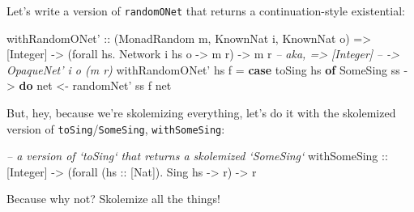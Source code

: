 \documentclass[]{article}
\newenvironment{Shaded}{}{}
\newcommand{\KeywordTok}[1]{\textcolor[rgb]{0.00,0.44,0.13}{\textbf{{#1}}}}
\newcommand{\DataTypeTok}[1]{\textcolor[rgb]{0.56,0.13,0.00}{{#1}}}
\newcommand{\CommentTok}[1]{\textcolor[rgb]{0.38,0.63,0.69}{\textit{{#1}}}}
\newcommand{\OtherTok}[1]{\textcolor[rgb]{0.00,0.44,0.13}{{#1}}}
\newcommand{\FunctionTok}[1]{\textcolor[rgb]{0.02,0.16,0.49}{{#1}}}
\newcommand{\NormalTok}[1]{{#1}}
\begin{document}
Let's write a version of \texttt{randomONet} that returns a continuation-style
existential:

\begin{Shaded}
\begin{Highlighting}[]
\OtherTok{withRandomONet' ::} \NormalTok{(}\DataTypeTok{MonadRandom} \NormalTok{m, }\DataTypeTok{KnownNat} \NormalTok{i, }\DataTypeTok{KnownNat} \NormalTok{o)}
                \OtherTok{=>} \NormalTok{[}\DataTypeTok{Integer}\NormalTok{]}
                \OtherTok{->} \NormalTok{(forall hs}\FunctionTok{.} \DataTypeTok{Network} \NormalTok{i hs o }\OtherTok{->} \NormalTok{m r)}
                \OtherTok{->} \NormalTok{m r}
\CommentTok{--         aka, => [Integer]}
\CommentTok{--              -> OpaqueNet' i o (m r)}
\NormalTok{withRandomONet' hs f }\FunctionTok{=} \KeywordTok{case} \NormalTok{toSing hs }\KeywordTok{of}
                         \DataTypeTok{SomeSing} \NormalTok{ss }\OtherTok{->} \KeywordTok{do}
                           \NormalTok{net }\OtherTok{<-} \NormalTok{randomNet' ss}
                           \NormalTok{f net}
\end{Highlighting}
\end{Shaded}

But, hey, because we're skolemizing everything, let's do it with the skolemized
version of \texttt{toSing}/\texttt{SomeSing}, \texttt{withSomeSing}:

\begin{Shaded}
\begin{Highlighting}[]
\CommentTok{-- a version of `toSing` that returns a skolemized `SomeSing`}
\OtherTok{withSomeSing ::} \NormalTok{[}\DataTypeTok{Integer}\NormalTok{]}
             \OtherTok{->} \NormalTok{(forall (}\OtherTok{hs ::} \NormalTok{[}\DataTypeTok{Nat}\NormalTok{])}\FunctionTok{.} \DataTypeTok{Sing} \NormalTok{hs }\OtherTok{->} \NormalTok{r)}
             \OtherTok{->} \NormalTok{r}
\end{Highlighting}
\end{Shaded}

Because why not? Skolemize all the things!

\begin{Shaded}
\end{Shaded}
\end{document}
